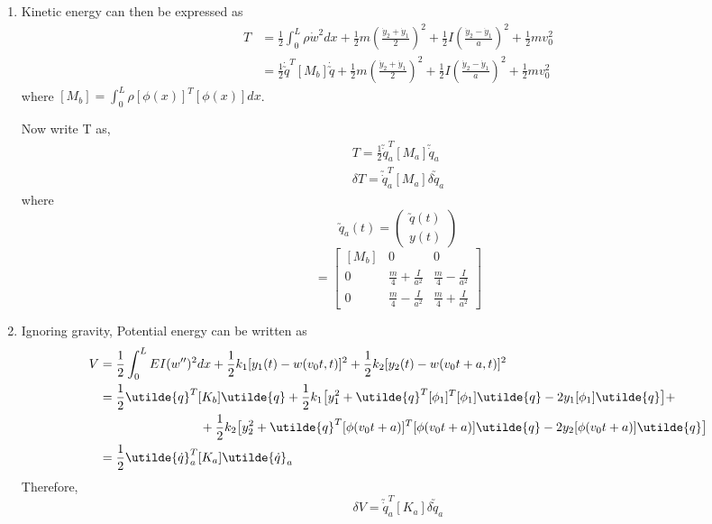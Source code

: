 \documentclass[11pt, oneside]{article}   	%
\begin{document}
\begin{enumerate}

\item Kinetic energy can then be expressed as
\begin{align}
 T &= \frac{1}{2} \int_0^L \rho \dot{w}^2 dx + \frac{1}{2}m \left(\frac{\dot{y}_2 + \dot{y}_1}{2}\right)^2 + \frac{1}{2}I\left(\frac{\dot{y}_2 - \dot{y}_1}{a}\right)^2 + \frac{1}{2}mv_0^2 \\
  &= \frac{1}{2}\dot{\utilde{q}}^T [M_b] \dot{\utilde{q}} + \frac{1}{2}m \left(\frac{\dot{y}_2 + \dot{y}_1}{2}\right)^2 + \frac{1}{2}I\left(\frac{\dot{y}_2 - \dot{y}_1}{a}\right)^2 + \frac{1}{2}mv_0^2
\end{align}
where $[M_b] = \int_0^L \rho [\phi(x)]^T [\phi(x)] dx$.

Now write T as,
\begin{align}
  T = \frac{1}{2}\utilde{\dot{q}}_a^T [M_a] \utilde{\dot{q}}_a \\
  \delta T = \utilde{\dot{q}}_a^T [M_a] \delta\utilde{\dot{q}}_a
\end{align}
where 
\begin{equation}
\utilde{q}_a(t) = \begin{pmatrix}
\utilde{q}(t) \\
y(t)
\end{pmatrix}
\end{equation}
\begin{equation}
[M_a] = \begin{bmatrix}
[M_b] & 0 & 0 \\
0 & \frac{m}{4}+\frac{I}{a^2} & \frac{m}{4}-\frac{I}{a^2} \\
0 & \frac{m}{4}-\frac{I}{a^2} & \frac{m}{4}+\frac{I}{a^2}
\end{bmatrix}
\end{equation}

\item Ignoring gravity, Potential energy can be written as
\begin{align}
 V &=  \frac{1}{2} \int_0^L EI (w'')^2dx + \frac{1}{2} k_1 [y_1(t) - w(v_0t,t)]^2 + \frac{1}{2} k_2 [y_2(t) - w(v_0t+a,t)]^2\\
 &=\frac{1}{2} \utilde{q}^T [K_b] \utilde{q} + \frac{1}{2} k_1 \big[y_1^2 + \utilde{q}^T [\phi_1]^T [\phi_1] \utilde{q} - 2y_1[\phi_1]\utilde{q} \big]+ \\ \notag
  &\qquad \qquad \qquad \qquad +\frac{1}{2} k_2 \big[y_2^2 + \utilde{q}^T [\phi(v_0t+a)]^T [\phi(v_0t+a)]\utilde{q} - 2y_2[\phi(v_0t+a)]\utilde{q} \big] \\
  &= \frac{1}{2}\utilde{\dot{q}}_a^T [K_a] \utilde{\dot{q}}_a 
\end{align}
Therefore,
\begin{equation}
\delta V = \utilde{\dot{q}}_a^T [K_a] \delta \utilde{\dot{q}}_a 
\end{equation}


\end{enumerate}
\end{document}
